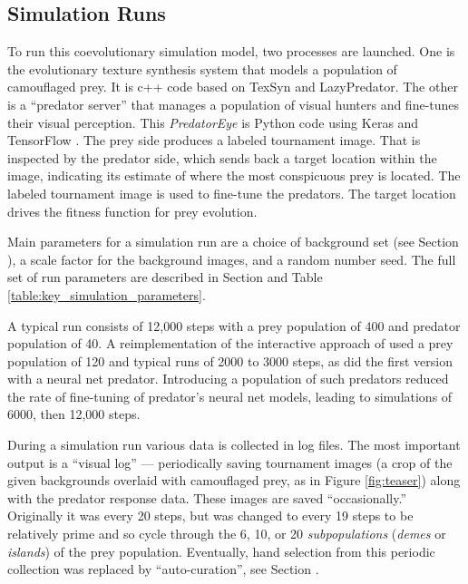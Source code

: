 \documentclass[letterpaper]{article}
\newcommand{\jargon}[1]{\textit{#1}}
\newcommand{\texsyn}[0]{TexSyn}
\newcommand{\lazypredator}[0]{LazyPredator}
\newcommand{\predatoreye}[0]{PredatorEye}
\begin{document}
\subsection{Simulation Runs}
\label{subsec:simulation_runs}
To run this coevolutionary simulation model, two processes are launched. One is the evolutionary texture synthesis system that models a population of camouflaged prey. It is c++ code based on \texsyn{} and \lazypredator{}. The other is a “predator server” that manages a population of visual hunters and fine-tunes their visual perception. This \jargon{\predatoreye{}} \citep{reynolds_predatoreye_2021} is Python code using Keras \citep{chollet_keras_2015} and TensorFlow \citep{tensorflow_whitepaper_2015}. The prey side produces a labeled tournament image. That is inspected by the predator side, which sends back a target location within the image, indicating its estimate of where the most conspicuous prey is located. The labeled tournament image is used to fine-tune the predators. The target location drives the fitness function for prey evolution.
\par
Main parameters for a simulation run are a choice of background set (see Section ), a scale factor for the background images, and a random number seed. The full set of run parameters are described in Section  and Table \ref{table:key_simulation_parameters}.
\par
A typical run consists of 12,000 steps with a prey population of 400 and predator population of 40. A reimplementation of the interactive approach of \citet{reynolds_iec_2011} used a prey population of 120 and typical runs of 2000 to 3000 steps, as did the first version with a neural net predator. Introducing a population of such predators reduced the rate of fine-tuning of predator's neural net models, leading to simulations of 6000, then 12,000 steps.
\par
During a simulation run various data is collected in log files. The most important output is a “visual log” --- periodically saving tournament images (a crop of the given backgrounds overlaid with camouflaged prey, as in Figure \ref{fig:teaser}) along with the predator response data. These images are saved “occasionally.” Originally it was every 20 steps, but was changed to every 19 steps to be relatively prime and so cycle through the 6, 10, or 20 \jargon{subpopulations} (\jargon{demes} or \jargon{islands}) of the prey population. Eventually, hand selection from this periodic collection was replaced by “auto-curation”, see Section .
\par
\end{document}
